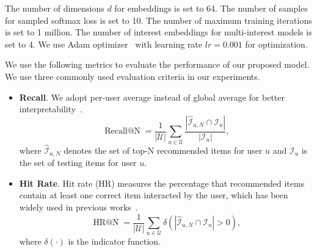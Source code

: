 The number of dimensions $d$ for embeddings is set to 64. The number of samples for sampled softmax loss is set to 10. The number of maximum training iterations is set to 1 million. The number of interest embeddings for multi-interest models is set to 4. We use Adam optimizer~\cite{kingma2014adam} with learning rate $lr=0.001$ for optimization.


We use the following metrics to evaluate the performance of our proposed model. We use three commonly used evaluation criteria in our experiments. 
\begin{itemize}
    \item \textbf{Recall}. We adopt per-user average instead of global average for better interpretability~\cite{karypis2001evaluation,chen2018sequential}.
        \begin{equation}
            \operatorname{Recall@N} = \frac{1}{|\mathcal{U}|}\sum_{u\in \mathcal{U}} \frac{|\mathcal{\hat{I}}_{u,N} \cap \mathcal{I}_{u}|}{|\mathcal{I}_u|},
        \end{equation}
        where $\mathcal{\hat{I}}_{u,N}$ denotes the set of top-N recommended items for user $u$ and $\mathcal{I}_u$ is the set of testing items for user $u$.
    
    \item \textbf{Hit Rate}. Hit rate (HR) measures the percentage that recommended items contain at least one correct item interacted by the user, which has been widely used in previous works~\cite{karypis2001evaluation,chen2018sequential}.
        \begin{equation}
            \operatorname{HR@N} = \frac{1}{|\mathcal{U}|}\sum_{u\in \mathcal{U}} \delta(|\mathcal{\hat{I}}_{u,N} \cap \mathcal{I}_{u}|>0),
        \end{equation}
        where $\delta(\cdot)$ is the indicator function.


\end{itemize}
